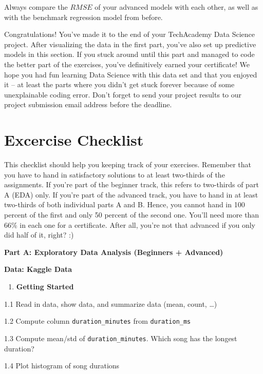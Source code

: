 \documentclass[
  11pt,
]{book}
\providecommand{\tightlist}{%
  \setlength{\itemsep}{0pt}\setlength{\parskip}{0pt}}
\begin{document}
Always compare the \(RMSE\) of your advanced models with each other, as well as with the benchmark regression model from before.

Congratulations! You've made it to the end of your TechAcademy Data Science project. After visualizing the data in the first part, you've also set up predictive models in this section. If you stuck around until this part and managed to code the better part of the exercises, you've definitively earned your certificate! We hope you had fun learning Data Science with this data set and that you enjoyed it -- at least the parts where you didn't get stuck forever because of some unexplainable coding error. Don't forget to send your project results to our project submission email address before the deadline.

\newpage

\hypertarget{excercise-checklist}{%
\chapter{Excercise Checklist}\label{excercise-checklist}}

This checklist should help you keeping track of your exercises. Remember that you have to hand in satisfactory solutions to at least two-thirds of the assignments. If you're part of the beginner track, this refers to two-thirds of part A (EDA) only. If you're part of the advanced track, you have to hand in at least two-thirds of both individual parts A and B. Hence, you cannot hand in 100 percent of the first and only 50 percent of the second one. You'll need more than 66\% in each one for a certificate. After all, you're not that advanced if you only did half of it, right? :)

\textbf{Part A: Exploratory Data Analysis (Beginners + Advanced)}

\textbf{Data: Kaggle Data}

\begin{enumerate}
\def\labelenumi{\arabic{enumi}.}
\tightlist
\item
  \textbf{Getting Started}
\end{enumerate}

1.1 Read in data, show data, and summarize data (mean, count, \ldots)

1.2 Compute column \texttt{duration\_minutes} from \texttt{duration\_ms}

1.3 Compute mean/std of \texttt{duration\_minutes}. Which song has the longest duration?

1.4 Plot histogram of song durations
\end{document}
